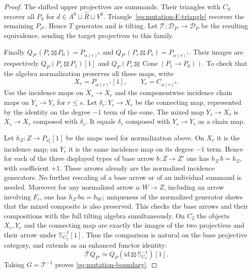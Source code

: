 \documentclass[11pt]{article}
\theoremstyle{definition}
\begin{document}
\begin{proof}
The shifted upper projectives are summands. Their triangles with
$C_d$ recover all $P_d$ for $d\in A^0\sqcup\widehat R\sqcup V^0$.
Triangle~\eqref{eq:mutation-F-triangle} recovers the remaining
$P_{r^0}$. Hence $T$ generates and is tilting. Let
$\mathcal T:\mathcal D_{P'}\to\mathcal D_P$ be the resulting
equivalence, sending the target projectives to this family.

Finally $Q_{P'}(P_r\boxtimes P_0)=P_{\alpha(r)^0}$ and
$Q_{P'}(P_r\boxtimes P_1)=P_{\alpha(r)^1}$. Their images are
respectively $Q_P(P_r\boxtimes P_1)[1]$ and
$Q_P(P_r\boxtimes\operatorname{Cone}(P_1\to P_0))$.
To check that the algebra normalization preserves all these maps,
write
\[
 X_r=P_{\alpha(r)^1}[1],\qquad Y_r=C_{\alpha(r)^0}.
\]
Use the incidence maps on $X_s\to X_r$ and the componentwise
incidence chain maps on $Y_s\to Y_r$ for $r\leq s$.
Let $\delta_r:Y_r\to X_r$ be the connecting map, represented by
the identity on the degree $-1$ term of the cone. The mixed map
$Y_s\to X_r$ is $X_s\to X_r$ composed with $\delta_s$.
It equals $\delta_r$ composed with $Y_s\to Y_r$ as a chain map.

Let $h_Z:Z\to P_{a_*^1}[1]$ be the maps used for normalization
above. On $X_r$ it is the incidence map; on $Y_r$ it is the same
incidence map on its degree $-1$ term. Hence for each of the
three displayed types of base arrow $b:Z\to Z'$ one has
$h_{Z'}b=h_Z$, with coefficient $+1$. These arrows already are
the normalized incidence generators. No further rescaling of a
base arrow or of an individual summand is needed. Moreover for
any normalized arrow $a:W\to Z$, including an arrow involving
$F_r$, one has $h_{Z'}ba=h_W$; uniqueness of the normalized
generator shows that the mixed composite is also preserved.
This checks the base arrows and their compositions with the full
tilting algebra simultaneously. On $C_2$ the objects $X_r,Y_r$
and the connecting map are exactly the images of the two
projectives and their arrow under $\mathbb S_{C_2}^{-1}[1]$.
Thus the comparison is natural on the base projective
category, and extends as an enhanced functor identity:
\[
 \mathcal T Q_{P'}\simeq
 Q_P(\mathrm{id}\boxtimes\mathbb S_{C_2}^{-1})[1].
\]
Taking $G=\mathcal T^{-1}$ proves \eqref{eq:mutation-boundary}.
\end{proof}
\end{document}

